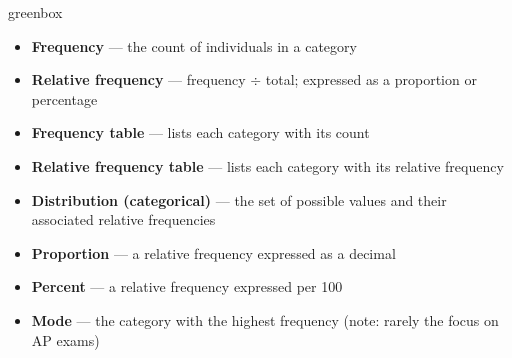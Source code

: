 \documentclass[10pt]{article}
\begin{document}
\begin{skillbox}{greenbox}
\begin{minipage}[t]{0.48\linewidth}
    \begin{itemize}
        \item \textbf{Frequency} --- the count of individuals in a category
        \item \textbf{Relative frequency} --- frequency $\div$ total; expressed as a
              proportion or percentage
        \item \textbf{Frequency table} --- lists each category with its count
        \item \textbf{Relative frequency table} --- lists each category with its
              relative frequency
    \end{itemize}
\end{minipage}
\hfill
\begin{minipage}[t]{0.48\linewidth}
    \begin{itemize}
        \item \textbf{Distribution (categorical)} --- the set of possible values and
              their associated relative frequencies
        \item \textbf{Proportion} --- a relative frequency expressed as a decimal
        \item \textbf{Percent} --- a relative frequency expressed per 100
        \item \textbf{Mode} --- the category with the highest frequency (note: rarely
              the focus on AP exams)
    \end{itemize}
\end{minipage}
\end{skillbox}
\end{document}
